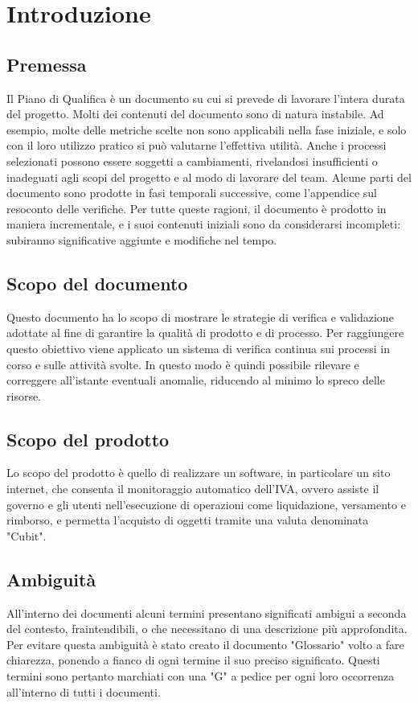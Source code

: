 \section{Introduzione}
\subsection{Premessa}
Il Piano di Qualifica è un documento su cui si prevede di lavorare l'intera durata del progetto.\newline 
Molti dei contenuti del documento sono di natura instabile. Ad esempio, molte delle metriche scelte non sono applicabili nella fase iniziale, e solo con il loro utilizzo pratico si può valutarne l'effettiva utilità. Anche i processi selezionati possono essere soggetti a cambiamenti, rivelandosi insufficienti o inadeguati agli scopi del progetto e al modo di lavorare del team.\newline 
Alcune parti del documento sono prodotte in fasi temporali successive, come l'appendice sul resoconto delle verifiche.\newline 
Per tutte queste ragioni, il documento è prodotto in maniera incrementale, e i suoi contenuti iniziali sono da considerarsi incompleti: subiranno significative aggiunte e modifiche nel tempo.
\subsection{Scopo del documento}
Questo documento ha lo scopo di mostrare le strategie di verifica e validazione adottate al fine di garantire la qualità di prodotto e di processo. Per raggiungere questo obiettivo viene applicato un sistema di verifica continua sui processi in corso e sulle attività svolte. In questo modo è quindi possibile rilevare e correggere all'istante eventuali anomalie, riducendo al minimo lo spreco delle risorse.
\subsection{Scopo del prodotto}
Lo scopo del prodotto è quello di realizzare un software, in particolare un sito internet, che consenta il monitoraggio automatico dell'IVA, ovvero assiste il governo e gli utenti nell'esecuzione di operazioni come liquidazione, versamento e rimborso, e permetta l'acquisto di oggetti tramite una valuta denominata "Cubit"\glosp{}.
\subsection{Ambiguità}
All’interno dei documenti alcuni termini presentano significati ambigui  a seconda del contesto, fraintendibili, o che necessitano di una descrizione più approfondita. Per evitare questa ambiguità è stato creato il documento "Glossario" volto a fare chiarezza, ponendo a fianco di ogni termine il suo preciso significato. Questi termini sono pertanto marchiati con una "G" a pedice per ogni loro occorrenza all'interno di tutti i documenti.
